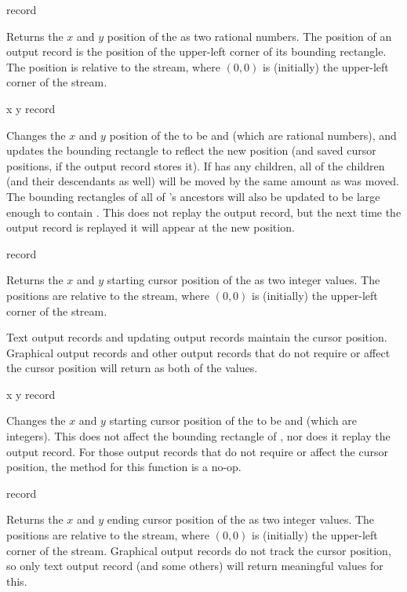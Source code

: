  {record}

Returns the $x$ and $y$ position of the   as two
rational numbers.  The position of an output record is the position of the
upper-left corner of its bounding rectangle.  The position is relative to the
stream, where $(0,0)$ is (initially) the upper-left corner of the stream.

 {x y record}

Changes the $x$ and $y$ position of the   to be
 and  (which are rational numbers), and updates the bounding
rectangle to reflect the new position (and saved cursor positions, if the output
record stores it).  If  has any children, all of the children (and
their descendants as well) will be moved by the same amount as  was
moved.  The bounding rectangles of all of 's ancestors will also be
updated to be large enough to contain .  This does not replay the
output record, but the next time the output record is replayed it will appear at
the new position.

 {record}

Returns the $x$ and $y$ starting cursor position of the 
 as two integer values.  The positions are relative to the stream,
where $(0,0)$ is (initially) the upper-left corner of the stream.

Text output records and updating output records maintain the cursor position.
Graphical output records and other output records that do not require or affect
the cursor position will return  as both of the values.

 {x y record}

Changes the $x$ and $y$ starting cursor position of the 
 to be  and  (which are integers).  This does not
affect the bounding rectangle of , nor does it replay the output
record.  For those output records that do not require or affect the cursor
position, the method for this function is a no-op.

 {record}

Returns the $x$ and $y$ ending cursor position of the 
 as two integer values.  The positions are relative to the stream,
where $(0,0)$ is (initially) the upper-left corner of the stream.  Graphical
output records do not track the cursor position, so only text output record (and
some others) will return meaningful values for this.

